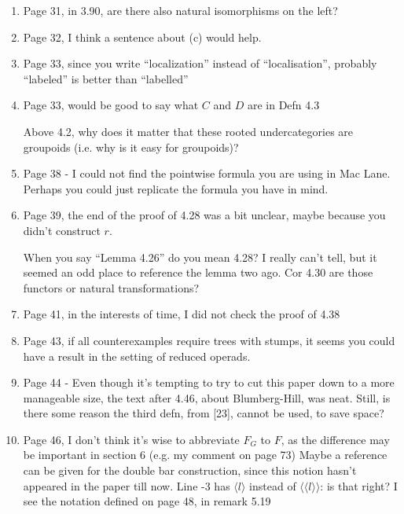 \documentclass{article}
\begin{document}
\begin{enumerate}
\item
Page 31, in 3.90, are there also natural isomorphisms on the left?

\item
Page 32, I think a sentence about (c) would help.

\item
Page 33, since you write ``localization'' instead of ``localisation'', probably ``labeled'' is better than ``labelled''

\item
Page 33, would be good to say what $C$ and $D$ are in Defn 4.3

Above 4.2, why does it matter that these rooted undercategories are groupoids (i.e. why is it easy for groupoids)?

\item
Page 38 - I could not find the pointwise formula you are using in Mac Lane. Perhaps you could just replicate the formula you have in mind.

\item
Page 39, the end of the proof of 4.28 was a bit unclear, maybe because you didn't construct $r$.

When you say ``Lemma 4.26'' do you mean 4.28? I really can't tell, but it seemed an odd place to reference the lemma two ago.
Cor 4.30 are those functors or natural transformations?

\item
Page 41, in the interests of time, I did not check the proof of 4.38

\item
Page 43, if all counterexamples require trees with stumps, it seems you could have a result in the setting of reduced operads.

\item
Page 44 - Even though it's tempting to try to cut this paper down to a more manageable size, the text after 4.46, about Blumberg-Hill, was neat. Still, is there some reason the third defn, from [23], cannot be used, to save space?

\item
Page 46, I don't think it's wise to abbreviate $F_G$ to $F$, as the difference may be important in section 6 (e.g. my comment on page 73)
Maybe a reference can be given for the double bar construction, since this notion hasn't appeared in the paper till now.
Line -3 has $\langle l \rangle$ instead of 
$\langle \langle l \rangle \rangle$: is that right? I see the notation defined on page 48, in remark 5.19


\end{enumerate}
\end{document}
